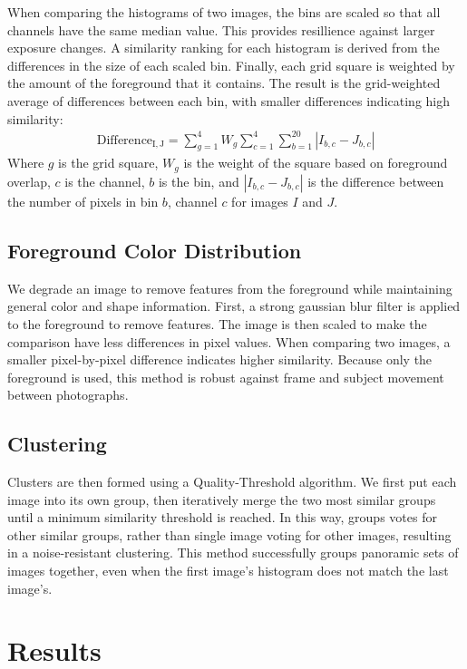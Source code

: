 \documentclass{article}
\begin{document}
When comparing the histograms of two images, the bins are scaled so that all channels have the same median value. This provides resillience against larger exposure changes. A similarity ranking for each histogram is derived from the differences in the size of each scaled bin. Finally, each grid square is weighted by the amount of the foreground that it contains. The result is the grid-weighted average of differences between each bin, with smaller differences indicating high similarity:
\begin{eqnarray}
\mathrm{Difference_{I,J}}=\displaystyle\sum\limits_{g=1}^4W_g\sum\limits_{c=1}^4\sum\limits_{b=1}^{20} |I_{b,c} - J_{b,c}|
\end{eqnarray}
Where \(g\) is the grid square, \(W_g\) is the weight of the square based on foreground overlap, \(c\) is the channel, \(b\) is the bin, and \(|I_{b,c}-J_{b,c}|\) is the difference between the number of pixels in bin \(b\), channel \(c\) for images \(I\) and \(J\).

\subsection{Foreground Color Distribution}
We degrade an image to remove features from the foreground while maintaining general color and shape information. First, a strong gaussian blur filter is applied to the foreground to remove features. The image is then scaled to make the comparison have less differences in pixel values. When comparing two images, a smaller pixel-by-pixel difference indicates higher similarity. Because only the foreground is used, this method is robust against frame and subject movement between photographs.

\subsection{Clustering}
Clusters are then formed using a Quality-Threshold algorithm. We first put each image into its own group, then iteratively merge the two most similar groups until a minimum similarity threshold is reached. In this way, groups votes for other similar groups, rather than single image voting for other images, resulting in a noise-resistant clustering. This method successfully groups panoramic sets of images together, even when the first image's histogram does not match the last image's. %


\section{Results}
\end{document}
